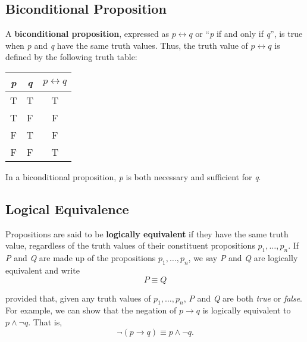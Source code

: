 \clearpage

\subsection*{Biconditional Proposition}

A \textbf{biconditional proposition}, expressed as $p \leftrightarrow q$ or ``\textit{p} if and only if \textit{q}'', is true when \textit{p} and \textit{q} have the same truth values.  Thus, the truth value of $p \leftrightarrow q$ is defined by the following truth table:

\begin{table}[h]
\centering
\begin{tabular}{|c|c|c|}
\hline
\textit{p} & \textit{q} & $p \leftrightarrow q$ \\ \hline
T          & T          & T       \\ \hline
T          & F          & F       \\ \hline
F          & T          & F       \\ \hline
F          & F          & T       \\ \hline
\end{tabular}
\end{table}

In a biconditional proposition, \textit{p} is both necessary and sufficient for \textit{q}.

\subsection*{Logical Equivalence}

Propositions are said to be \textbf{logically equivalent} if they have the same truth value, regardless of the truth values of their constituent propositions $p_1, \dots, p_n$.  If \textit{P} and \textit{Q} are made up of the propositions $p_1, \dots, p_n$, we say \textit{P} and \textit{Q} are logically equivalent and write
\[
    P \equiv Q
\]

provided that, given any truth values of $p_1, \dots, p_n$, \textit{P} and \textit{Q} are both \textit{true} or \textit{false}.\\

For example, we can show that the negation of $p \rightarrow q$ is logically equivalent to $p \land \lnot q$.  That is, 
\[
    \lnot (p \rightarrow q) \equiv p \land \lnot q.
\]

